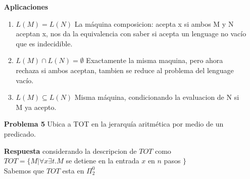 \documentclass{article}
\begin{document}
\begin{enumerate}
\item[\bf{Aplicaciones}]
\begin{enumerate} 
\item $L(M) = L(N)$
La máquina composicion: acepta x si ambos M y N aceptan x, nos da la equivalencia con saber si acepta un lenguage no vacío que es indecidible.
\item $L(M) \cap L(N)=\emptyset$
Exactamente la misma maquina, pero ahora rechaza si ambos aceptan, tambien se reduce al problema del lenguage vacío.
\item$L(M) \subseteq L(N)$
Misma máquina, condicionando la evaluacion de N si M ya acepto.

\end{enumerate}

\item[\bf{Problema 5}]Ubica a TOT en la jerarquía aritmética por medio de un predicado. 
\item[\bf{Respuesta}]
considerando la descripcion de $TOT$ como \\
$TOT=\{M| \forall x \exists t. M $ se detiene en la entrada $ x $ en $ n $ pasos $\}$\\
Sabemos que $TOT$ esta en $\Pi_2^0$


\end{enumerate}
\end{document}
